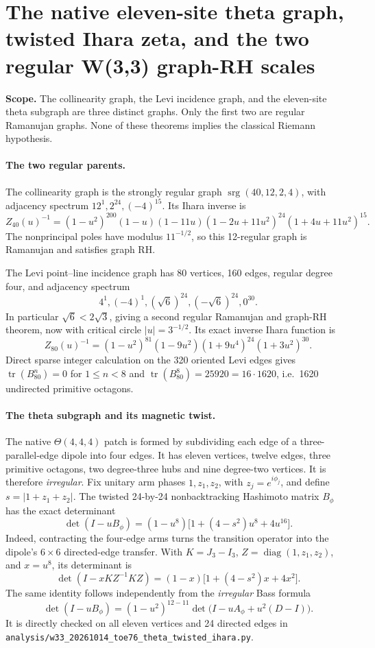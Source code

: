 \section*{The native eleven-site theta graph, twisted Ihara zeta,
  and the two regular W(3,3) graph-RH scales}
\noindent\textbf{Scope.}
The collinearity graph, the Levi incidence graph, and the eleven-site
theta subgraph are three distinct graphs.  Only the first two are
regular Ramanujan graphs.  None of these theorems implies the classical
Riemann hypothesis.

\paragraph{The two regular parents.}
The collinearity graph is the strongly regular graph
\(\operatorname{srg}(40,12,2,4)\), with adjacency spectrum
\(12^1,2^{24},(-4)^{15}\).  Its Ihara inverse is
\[
Z_{40}(u)^{-1}
=(1-u^2)^{200}(1-u)(1-11u)
 (1-2u+11u^2)^{24}(1+4u+11u^2)^{15}.
\]
The nonprincipal poles have modulus \(11^{-1/2}\), so this
12-regular graph is Ramanujan and satisfies graph RH.

The Levi point--line incidence graph has 80 vertices, 160 edges,
regular degree four, and adjacency spectrum
\[
4^1,(-4)^1,(\sqrt6)^{24},(-\sqrt6)^{24},0^{30}.
\]
In particular \(\sqrt6<2\sqrt3\), giving a second regular
Ramanujan and graph-RH theorem, now with critical circle
\(\lvert u\rvert=3^{-1/2}\).
Its exact inverse Ihara function is
\[
\boxed{
Z_{80}(u)^{-1}
=(1-u^2)^{81}(1-9u^2)
 (1+9u^4)^{24}(1+3u^2)^{30}.}
\]
Direct sparse integer calculation on the 320 oriented Levi edges gives
\(\operatorname{tr}(B_{80}^n)=0\) for \(1\le n<8\) and
\(\operatorname{tr}(B_{80}^8)=25920=16\cdot1620\), i.e.\
1620 undirected primitive octagons.

\paragraph{The theta subgraph and its magnetic twist.}
The native \(\Theta(4,4,4)\) patch is formed by subdividing each
edge of a three-parallel-edge dipole into four edges.  It has eleven
vertices, twelve edges, three primitive octagons, two degree-three
hubs and nine degree-two vertices.  It is therefore \emph{irregular}.
Fix unitary arm phases \(1,z_1,z_2\), with
\(z_j=e^{i\phi_j}\), and define
\(s=\lvert1+z_1+z_2\rvert\).
The twisted 24-by-24 nonbacktracking Hashimoto matrix \(B_\phi\)
has the exact determinant
\[
\boxed{
\det(I-uB_\phi)=
 (1-u^8)\bigl[1+(4-s^2)u^8+4u^{16}\bigr].}
\]
Indeed, contracting the four-edge arms turns the transition operator
into the dipole's \(6\times6\) directed-edge transfer.  With
\(K=J_3-I_3\), \(Z=\operatorname{diag}(1,z_1,z_2)\),
and \(x=u^8\), its determinant is
\[
\det(I-xKZ^{-1}KZ)
=(1-x)\bigl[1+(4-s^2)x+4x^2\bigr].
\]
The same identity follows independently from the \emph{irregular}
Bass formula
\[
\det(I-uB_\phi)
=(1-u^2)^{12-11}
  \det\bigl(I-uA_\phi+u^2(D-I)\bigr).
\]
It is directly checked on all eleven vertices and 24 directed edges
in \texttt{analysis/w33\_20261014\_toe76\_theta\_twisted\_ihara.py}.

